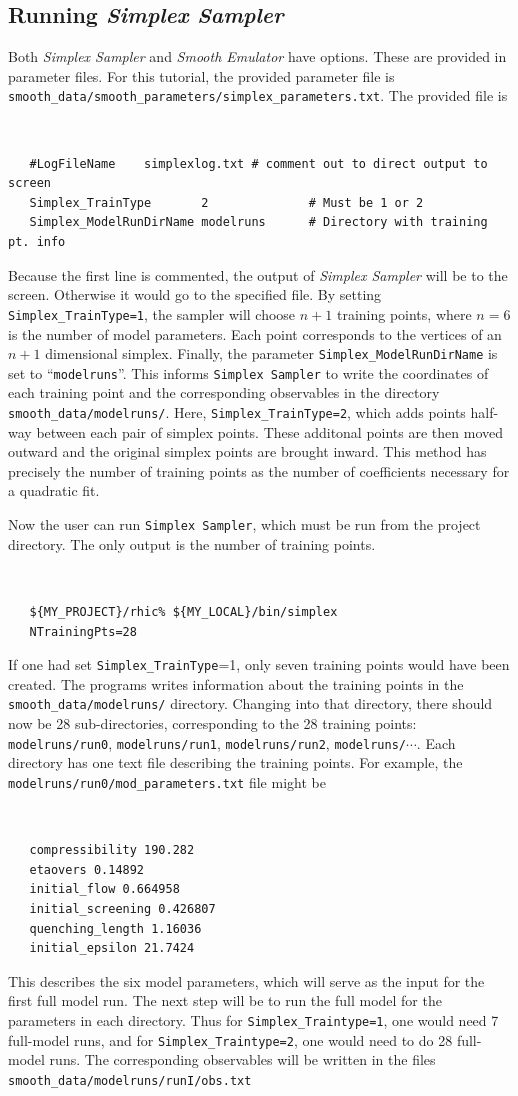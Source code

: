\documentclass[UserManual.tex]{subfiles}
\begin{document}
\subsection{Running {\it Simplex Sampler}}

Both {\it Simplex Sampler} and {\it Smooth Emulator} have options. These are provided in parameter files. For this tutorial, the provided parameter file is {\tt smooth\_data/smooth\_parameters/simplex\_parameters.txt}. The provided file is
{\tt
\begin{verbatim}
   #LogFileName    simplexlog.txt # comment out to direct output to screen
   Simplex_TrainType       2              # Must be 1 or 2             
   Simplex_ModelRunDirName modelruns      # Directory with training pt. info
\end{verbatim}
}
Because the first line is commented, the output of {\it Simplex Sampler} will be to the screen. Otherwise it would go to the specified file. By setting {\tt Simplex\_TrainType=1}, the sampler will choose $n+1$ training points, where $n=6$ is the number of model parameters. Each point corresponds to the vertices of an $n+1$ dimensional simplex.  Finally, the parameter {\tt Simplex\_ModelRunDirName} is set to ``{\tt modelruns}''. This informs {\tt Simplex Sampler} to write the coordinates of each training point and the corresponding observables in the directory {\tt smooth\_data/modelruns/}. Here, {\tt Simplex\_TrainType=2}, which adds points half-way between each pair of simplex points. These additonal points are then moved outward and the original simplex points are brought inward. This method has precisely the number of training points as the number of coefficients necessary for a quadratic fit. 

Now the user can run {\tt Simplex Sampler}, which must be run from the project directory. The only output is the number of training points.
 {\tt
\begin{verbatim}
   ${MY_PROJECT}/rhic% ${MY_LOCAL}/bin/simplex
   NTrainingPts=28
\end{verbatim}
}
If one had set {\tt Simplex\_TrainType}=1, only seven training points would have been created. The programs writes information about the training points in the {\tt smooth\_data/modelruns/} directory. Changing into that directory, there should now be 28 sub-directories, corresponding to the 28 training points: {\tt modelruns/run0}, {\tt modelruns/run1}, {\tt modelruns/run2}, {\tt modelruns/}$\cdots$. Each directory has one text file describing the training points. For example, the {\tt modelruns/run0/mod\_parameters.txt} file might be 
{\tt
\begin{verbatim}
   compressibility 190.282
   etaovers 0.14892
   initial_flow 0.664958
   initial_screening 0.426807
   quenching_length 1.16036
   initial_epsilon 21.7424
\end{verbatim}
}
This describes the six model parameters, which will serve as the input for the first full model run.  The next step will be to run the full model for the parameters in each directory. Thus for {\tt Simplex\_Traintype=1}, one would need 7 full-model runs, and for {\tt Simplex\_Traintype=2}, one would need to do 28 full-model runs. The corresponding observables will be written in the files {\tt smooth\_data/modelruns/runI/obs.txt}
\end{document}
